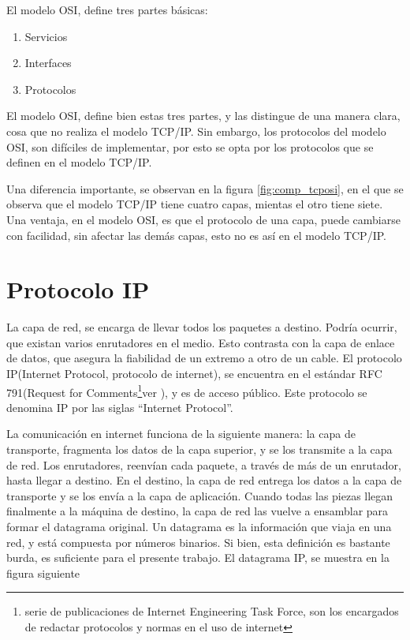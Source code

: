 El modelo OSI, define tres partes básicas: 
\begin{enumerate}
	\item Servicios 
	\item Interfaces 
	\item Protocolos
\end{enumerate}

El modelo OSI, define bien estas tres partes, y las distingue de una manera clara, cosa que no realiza el modelo TCP/IP. Sin embargo, los protocolos del modelo OSI, son difíciles de implementar, por esto se opta por los protocolos que se definen en el modelo TCP/IP. 

Una diferencia importante, se observan en la figura \ref{fig:comp_tcposi}, en el que se observa que el modelo TCP/IP tiene cuatro capas, mientas el otro tiene siete. Una ventaja, en el modelo OSI, es que el protocolo de una capa, puede cambiarse con facilidad, sin afectar las demás capas, esto no es así en el modelo TCP/IP. 


\section{Protocolo IP} 
La capa de red, se encarga de llevar todos los paquetes a destino. Podría ocurrir, que existan varios enrutadores en el medio. Esto contrasta con la capa de enlace de datos, que asegura la fiabilidad de un extremo a otro de un cable. El protocolo IP(Internet Protocol, protocolo de internet), se encuentra en el estándar RFC 791(Request for Comments\footnote{serie de publicaciones de Internet Engineering Task Force, son los encargados de redactar protocolos y normas en el uso de internet}ver \cite{RFCIP}), y es de acceso público. Este protocolo se denomina IP por las siglas ``Internet Protocol''. 

La comunicación en internet funciona de la siguiente manera: la capa de transporte, fragmenta los datos de la capa superior, y se los transmite a la capa de red. Los enrutadores, reenvían cada paquete, a través de más de un enrutador, hasta llegar a destino. En el destino, la capa de red entrega los datos a la capa de transporte y se los envía a la capa de aplicación. Cuando todas las piezas llegan finalmente a la máquina de destino, la capa de red las vuelve a ensamblar para formar el datagrama original. Un datagrama es la información que viaja en una red, y está compuesta por números binarios. Si bien, esta definición es bastante burda, es suficiente para el presente trabajo. El datagrama IP, se muestra en la figura siguiente 

